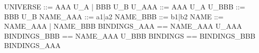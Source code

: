 \begin{zed}
[U\_A,U\_B]
\also UNIVERSE ::= AAA \ldata U\_A \rdata | BBB \ldata U\_B \rdata
\also U\_AAA ::= AAA \ldata U\_A \rdata
\also U\_BBB ::= BBB \ldata U\_B \rdata
\also NAME\_AAA ::= a1|a2
\also NAME\_BBB ::= b1|b2
\also NAME ::= NAME\_AAA | NAME\_BBB
\also BINDINGS\_AAA == NAME\_AAA \cross U\_AAA
\also BINDINGS\_BBB == NAME\_AAA \cross U\_BBB
\also BINDINGS == BINDINGS\_BBB \cup BINDINGS\_AAA
\end{zed}

